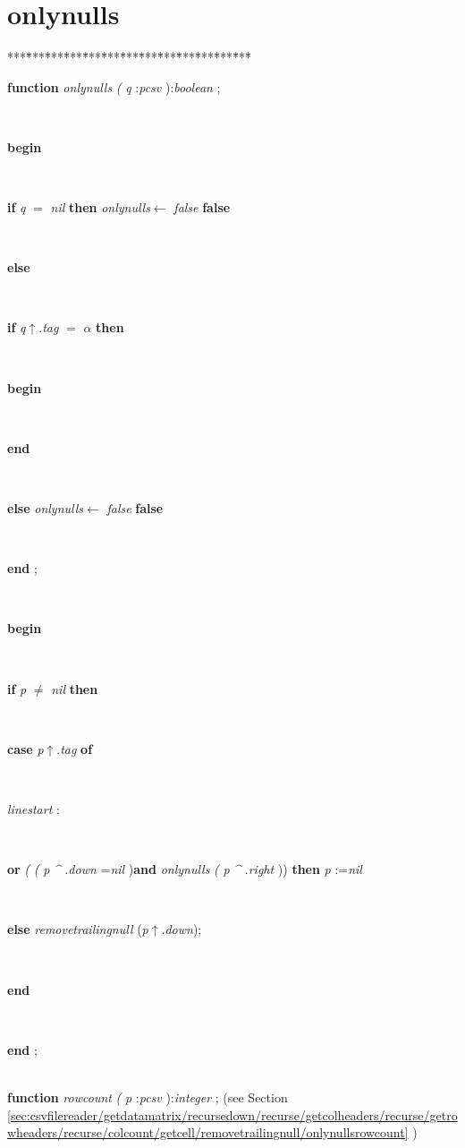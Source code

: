 \section{onlynulls}\label{sec:csvfilereader/getdatamatrix/recursedown/recurse/getcolheaders/recurse/getrowheaders/recurse/colcount/getcell/removetrailingnullonlynulls}

\begin{tabbing}
***\=***\=***\=***\=***\=***\=***\=***\=***\=***\=***\=***\=***\=\kill
\parbox{14cm}{\textsf{\textbf{function}  \textit{onlynulls} \textit{(} \textit{q} :\textit{pcsv} ):\textit{boolean} ;}}\\
\+\parbox{14cm}{\textsf{\textbf{begin} }}\\
\+\parbox{14cm}{\textsf {\textbf {if } \textsf{\textit{q} $=$ \textit{nil}} \textbf{ then } \textsf{\textit{onlynulls}$\leftarrow$ \textit{false}} \textbf{ false } }}\\
\<\parbox{14cm}{\textsf{\textbf{else} }}\\
\+\parbox{14cm}{\textsf {\textbf {if } \textsf{\textit{q}$\uparrow$.\textit{tag} $=$ \textit{$\alpha$}} \textbf{ then } }}\\
\<\parbox{14cm}{\textsf{\textbf{begin} }}\\
\<\-\parbox{14cm}{\textsf{\textbf{end} }}\\
\+\parbox{14cm}{\textsf {\textbf {else } \textsf{\textit{onlynulls}$\leftarrow$ \textit{false}} \textbf{ false } }}\\
\<\-\<\-\<\-\parbox{14cm}{\textsf{\textbf{end} ;}}\\
\+\parbox{14cm}{\textsf{\textbf{begin} }}\\
\+\parbox{14cm}{\textsf {\textbf {if } \textsf{\textit{p} $\neq$ \textit{nil}} \textbf{ then } }}\\
\+\parbox{14cm}{\textsf {\textbf {case } \textsf{\textit{p}$\uparrow$.\textit{tag}} \textbf{ of } }}\\
\parbox{14cm}{\textsf{\textit{linestart} : \textit{}}}\\
\+\parbox{14cm}{\textsf{\textbf{or} \textit{(} \textit{(} \textit{p} \textit{\^{}} .\textit{down} =\textit{nil} )\textbf{and}  \textit{onlynulls} \textit{(} \textit{p} \textit{\^{}} .\textit{right} )) \textbf{then}  \textit{p} :=\textit{nil} }}\\
\-\<\parbox{14cm}{\textsf {\textbf {else } \textsf{\textit{removetrailingnull} (\textit{p}$\uparrow$.\textit{down})}; }}\\
\<\-\parbox{14cm}{\textsf{\textbf{end} }}\\
\<\-\<\-\parbox{14cm}{\textsf{\textbf{end} ;}}\\
\+\textsf{\textbf{function}  \textit{rowcount} \textit{(} \textit{p} :\textit{pcsv} ):\textit{integer} ;} (see Section \ref{sec:csvfilereader/getdatamatrix/recursedown/recurse/getcolheaders/recurse/getrowheaders/recurse/colcount/getcell/removetrailingnull/onlynullsrowcount} )\\
\end{tabbing}
